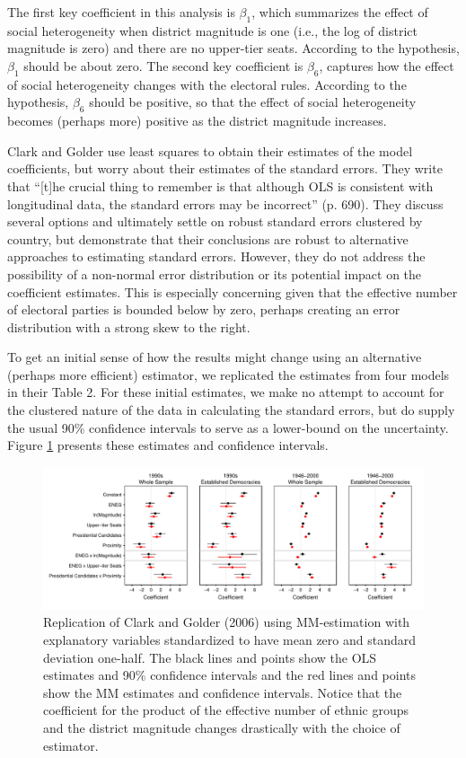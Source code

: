 \documentclass[12pt]{article}
\begin{document}
The first key coefficient in this analysis is $\beta_1$, which summarizes the effect of social heterogeneity when district magnitude is one (i.e., the log of district magnitude is zero) and there are no upper-tier seats. According to the hypothesis, $\beta_1$ should be about zero. The second key coefficient is $\beta_6$, captures how the effect of social heterogeneity changes with the electoral rules. According to the hypothesis, $\beta_6$ should be positive, so that the effect of social heterogeneity becomes (perhaps more) positive as the district magnitude increases.

Clark and Golder use least squares to obtain their estimates of the model coefficients, but worry about their estimates of the standard errors. They write that ``[t]he crucial thing to remember is that although OLS is consistent with longitudinal data, the standard errors may be incorrect'' (p. 690). They discuss several options and ultimately settle on robust standard errors clustered by country, but demonstrate that their conclusions are robust to alternative approaches to estimating standard errors. However, they do not address the possibility of a non-normal error distribution or its potential impact on the coefficient estimates. This is especially concerning given that the effective number of electoral parties is bounded below by zero, perhaps creating an error distribution with a strong skew to the right. 

To get an initial sense of how the results might change using an alternative (perhaps more efficient) estimator, we replicated the estimates from four models in their Table 2. For these initial estimates, we make no attempt to account for the clustered nature of the data in calculating the standard errors, but do supply the usual 90\% confidence intervals to serve as a lower-bound on the uncertainty. Figure \ref{fig:cg-coef-plots} presents these estimates and confidence intervals.

\begin{figure}[H]
\begin{center}
\includegraphics[scale = .8]{figs/cg-coef-plots.pdf}
\caption{Replication of Clark and Golder (2006) using MM-estimation with explanatory variables standardized to have mean zero and standard deviation one-half. The black lines and points show the OLS estimates and 90\% confidence intervals and the red lines and points show the MM estimates and confidence intervals. Notice that the coefficient for the product of the effective number of ethnic groups and the district magnitude changes drastically with the choice of estimator.}\label{fig:cg-coef-plots}
\end{center}
\end{figure}
\end{document}
